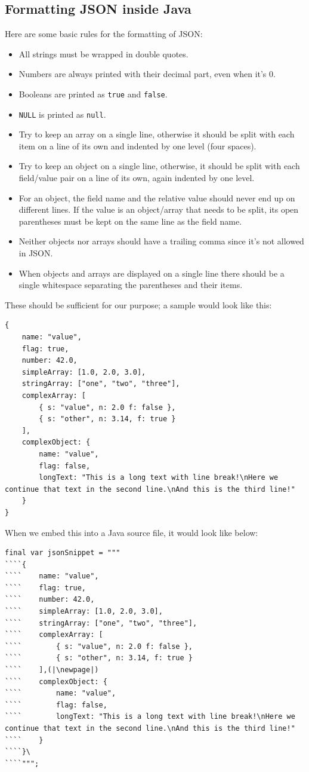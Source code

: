 \subsection{Formatting JSON inside Java}\label{sec:FormattingJSONInsideJava}
Here are some basic rules for the formatting of JSON:
\begin{itemize}
	\item{All strings must be wrapped in double quotes.}
	\item{Numbers are always printed with their decimal part, even when it’s 0.}
	\item{Booleans are printed as \verb#true# and \verb#false#.}
	\item{\lstinline|NULL| is printed as \verb#null#.}
	\item{Try to keep an array on a single line, otherwise it should be split with each item on a line of its own and indented by one level (four spaces).}
	\item{Try to keep an object on a single line, otherwise, it should be split with each field/value pair on a line of its own, again indented by one level.}
	\item{For an object, the field name and the relative value should never end up on different lines. If the value is an object/array that needs to be split, its open parentheses must be kept on the same line as the field name.}
	\item{Neither objects nor arrays should have a trailing comma since it’s not allowed in JSON.}
	\item{When objects and arrays are displayed on a single line there should be a single whitespace separating the parentheses and their items.}
\end{itemize}

These should be sufficient for our purpose; a sample would look like this:
\begin{lstlisting}[language={}]
{
    name: "value",
    flag: true,
    number: 42.0,
    simpleArray: [1.0, 2.0, 3.0],
    stringArray: ["one", "two", "three"],
    complexArray: [
        { s: "value", n: 2.0 f: false },
        { s: "other", n: 3.14, f: true }
    ],
    complexObject: {
        name: "value",
        flag: false,
        longText: "This is a long text with line break!\nHere we continue that text in the second line.\nAnd this is the third line!"
    }       
}
\end{lstlisting}

When we embed this into a Java source file, it would look like below:
\begin{lstlisting}
final var jsonSnippet = """
````{
````    name: "value",
````    flag: true,
````    number: 42.0,
````    simpleArray: [1.0, 2.0, 3.0],
````    stringArray: ["one", "two", "three"],
````    complexArray: [
````        { s: "value", n: 2.0 f: false },
````        { s: "other", n: 3.14, f: true }
````    ],(|\newpage|)
````    complexObject: {
````        name: "value",
````        flag: false,
````        longText: "This is a long text with line break!\nHere we continue that text in the second line.\nAnd this is the third line!"
````    }       
````}\
````""";
\end{lstlisting}

